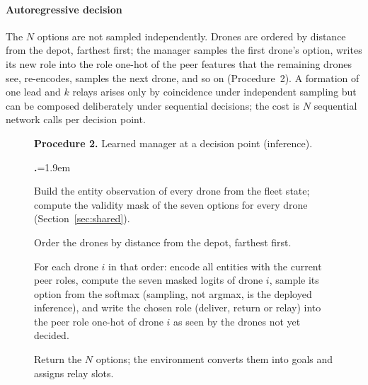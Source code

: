 \documentclass[final,5p,times,twocolumn]{elsarticle}
\newcounter{procstep}
\newenvironment{procsteps}{\setcounter{procstep}{0}\begin{list}{\stepcounter{procstep}\textbf{\theprocstep.}}{\leftmargin=1.9em\itemsep=1.5pt\parsep=0pt\topsep=3pt}}{\end{list}}
\begin{document}
\paragraph{Autoregressive decision}
The $N$ options are not sampled independently. Drones are ordered by distance from the depot,
farthest first; the manager samples the first drone's option, writes its new role into the
role one-hot of the peer features that the remaining drones see, re-encodes, samples the next
drone, and so on (Procedure~2). A formation of one lead and $k$ relays arises
only by coincidence under independent sampling but can be composed deliberately under sequential
decisions; the cost is $N$ sequential network calls per decision point.

\begin{figure}[t]
\footnotesize
\noindent\textbf{Procedure 2.} Learned manager at a decision point (inference).
\begin{procsteps}
\item Build the entity observation of every drone from the fleet state; compute the validity mask
of the seven options for every drone (Section~\ref{sec:shared}).
\item Order the drones by distance from the depot, farthest first.
\item For each drone $i$ in that order: encode all entities with the current peer roles, compute
the seven masked logits of drone $i$, sample its option from the softmax (sampling, not argmax,
is the deployed inference), and write the chosen role (deliver, return or relay) into the peer
role one-hot of drone $i$ as seen by the drones not yet decided.
\item Return the $N$ options; the environment converts them into goals and assigns relay slots.
\end{procsteps}
\label{proc:learn}
\end{figure}
\end{document}
